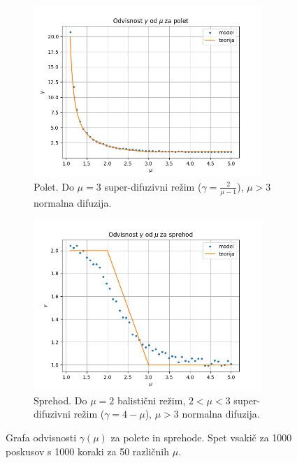 \documentclass[a4paper, 12pt, slovene]{article}
\begin{document}
\begin{figure}[H]
\centering
\begin{subfigure}{0.49\textwidth}
	\centering
	\includegraphics[width=0.95\textwidth]{grafi/gamma-poleti.png}
	\caption{Polet. Do $\mu = 3$ super-difuzivni režim ($\gamma = \frac{2}{\mu-1}$), $\mu>3$ normalna difuzija.}
	\label{fig-gmul}
\end{subfigure}
\begin{subfigure}{0.49\textwidth}
	\centering
	\includegraphics[width=0.95\textwidth]{grafi/gamma-sprehodi.png}
	\caption{Sprehod. Do $\mu = 2$ balistični režim, $2<\mu<3$ super-difuzivni režim ($\gamma = 4-\mu$), $\mu>3$ normalna difuzija.}
	\label{fig-gmus}
\end{subfigure}
\caption{Grafa odvisnosti $\gamma(\mu)$ za polete in sprehode. Spet vsakič za 1000 poskusov s 1000 koraki za 50 različnih $\mu$.}
\label{fig-gamma}
\end{figure} \par\vspace{5mm}
\end{document}
